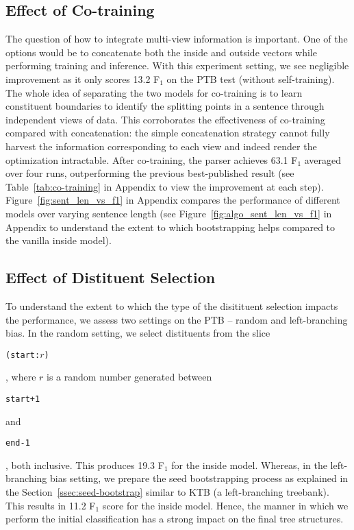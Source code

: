 \documentclass[11pt]{article}
\newcommand{\ptb}{\textsc{PTB}}
\newcommand{\ktb}{\textsc{KTB}}
\begin{document}
\subsection{Effect of Co-training}
\label{ssec:effect-of-cotraining}
The question of how to integrate multi-view information is important. One of the options would be to concatenate both the inside and outside vectors while performing training and inference. With this experiment setting, we see negligible improvement as it only scores 13.2 F$_1$ on the PTB test (without self-training). The whole idea of separating the two models for co-training is to learn constituent boundaries to identify the splitting points in a sentence through independent views of data. This  corroborates the effectiveness of co-training compared with concatenation: the simple concatenation strategy cannot fully harvest the information corresponding to each view and indeed render the optimization intractable. After co-training, the parser achieves 63.1 F$_1$ averaged over four runs, outperforming the previous best-published result (see Table~\ref{tab:co-training} in Appendix to view the improvement at each step). Figure~\ref{fig:sent_len_vs_f1} in Appendix compares the performance of different models over varying sentence length (see Figure~\ref{fig:algo_sent_len_vs_f1} in Appendix to understand the extent to which bootstrapping helps compared to the vanilla inside model).


\subsection{Effect of Distituent Selection}
\label{ssec:effect-of-dist-select}
To understand the extent to which the type of the disitituent selection impacts the performance, we assess two settings on the \ptb{} -- random and left-branching bias. In the random setting, we select distituents from the slice \begin{small}\texttt{(start:$r$)}\end{small}, where $r$ is a random number generated between \begin{small}\texttt{start+1}\end{small} and \begin{small}\texttt{end-1}\end{small}, both inclusive. This produces 19.3 F$_{1}$ for the inside model. Whereas, in the left-branching bias setting, we prepare the seed bootstrapping process as explained in the Section~\ref{ssec:seed-bootstrap} similar to \ktb{} (a left-branching treebank). This results in 11.2 F$_{1}$ score for the inside model. Hence, the manner in which we perform the initial classification has a strong impact on the final tree structures.
\end{document}
